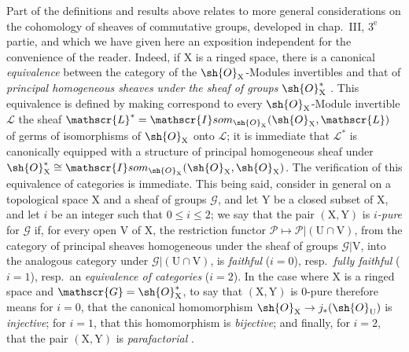 \begin{remark}[21.13.13]
\label{IV.21.13.13}
Part of the definitions and results above relates to more general considerations on the cohomology of sheaves of commutative groups, developed in chap.~III, $3^{\text{e}}$ partie, and which we have given here an exposition independent for the convenience of the reader.
Indeed, if $\mathrm{X}$ is a ringed space, there is a canonical \emph{equivalence} between the category of the $\sh{O}_{\mathrm{X}}$-Modules invertibles and that of \emph{principal homogeneous sheaves under the sheaf of groups} $\sh{O}_{\mathrm{X}}^*$ .
This equivalence is defined by making correspond to every $\sh{O}_{\mathrm{X}}$-Module invertible $\mathscr{L}$ the sheaf $\mathscr{L}^*=\mathscr{I}som_{\sh{O}_{\mathrm{X}}}(\sh{O}_{\mathrm{X}},\mathscr{L})$ of germs of isomorphisms of $\sh{O}_{\mathrm{X}}$ onto $\mathscr{L}$; it is immediate that $\mathscr{L}^*$ is canonically equipped with a structure of principal homogeneous sheaf under $\sh{O}_{\mathrm{X}}^*\cong\mathscr{I}som_{\sh{O}_{\mathrm{X}}}(\sh{O}_{\mathrm{X}},\sh{O}_{\mathrm{X}})$.
The verification of this equivalence of categories is immediate.
This being said, consider in general on a topological space $\mathrm{X}$ and a sheaf of groups $\mathscr{G}$, and let $\mathrm{Y}$ be a closed subset of $\mathrm{X}$, and let $i$ be an integer such that $0\leq i\leq 2$; we say that the pair $(\mathrm{X},\mathrm{Y})$ is \emph{$i$-pure} for $\mathscr{G}$ if, for every open $\mathrm{V}$ of $\mathrm{X}$, the restriction functor $\mathscr{P}\mapsto\mathscr{P}|(\mathrm{U}\cap\mathrm{V})$, from the category of principal sheaves homogeneous under the sheaf of groups $\mathscr{G}|\mathrm{V}$, into the analogous category under $\mathscr{G}|(\mathrm{U}\cap\mathrm{V})$, is \emph{faithful} ($i=0$), resp.\ \emph{fully faithful} ($i=1$), resp.\ an \emph{equivalence of categories} ($i=2$).
In the case where $\mathrm{X}$ is a ringed space and $\mathscr{G}=\sh{O}_{\mathrm{X}}^*$, to say that $(\mathrm{X},\mathrm{Y})$ is $0$-pure therefore means for $i=0$, that the canonical homomorphism $\sh{O}_{\mathrm{X}}\to j_*(\sh{O}_{\mathrm{U}})$ is \emph{injective}; for $i=1$, that this homomorphism is \emph{bijective}; and finally, for $i=2$, that the pair $(\mathrm{X},\mathrm{Y})$ is \emph{parafactorial} .


\end{remark}
